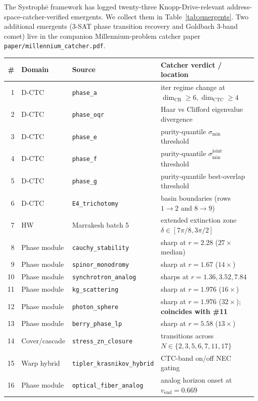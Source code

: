 \documentclass[11pt,a4paper]{article}
\begin{document}
The Systroph\=e framework has logged twenty-three Knopp-Drive-relevant address-space-catcher-verified emergents. We collect them in Table~\ref{tab:emergents}. Two additional emergents (3-SAT phase transition recovery and Goldbach 3-band comet) live in the companion Millennium-problem catcher paper \texttt{paper/millennium\_catcher.pdf}.
\begin{table}[h]
\centering
\small
\begin{tabular}{rlll}
\toprule
\# & Domain & Source & Catcher verdict / location \\
\midrule
1 & D-CTC & \texttt{phase\_a} & iter regime change at $\dim_{\mathrm{CR}}{\ge}6,\dim_{\mathrm{CTC}}{\ge}4$ \\
2 & D-CTC & \texttt{phase\_oqr} & Haar vs Clifford eigenvalue divergence \\
3 & D-CTC & \texttt{phase\_e} & purity-quantile $\sigma_{\min}$ threshold \\
4 & D-CTC & \texttt{phase\_f} & purity-quantile $\sigma_{\min}^{\mathrm{joint}}$ threshold \\
5 & D-CTC & \texttt{phase\_g} & purity-quantile best-overlap threshold \\
6 & D-CTC & \texttt{E4\_trichotomy} & basin boundaries (rows $1{\to}2$ and $8{\to}9$)\\
7 & HW & Marrakesh batch 5 & extended extinction zone $\delta\in[7\pi/8,3\pi/2]$\\
8 & Phase module & \texttt{cauchy\_stability} & sharp at $r=2.28$ ($27\times$ median)\\
9 & Phase module & \texttt{spinor\_monodromy} & sharp at $r=1.67$ ($14\times$)\\
10 & Phase module & \texttt{synchrotron\_analog} & sharps at $r=1.36, 3.52, 7.84$\\
11 & Phase module & \texttt{kg\_scattering} & sharp at $r=1.976$ ($16\times$)\\
12 & Phase module & \texttt{photon\_sphere} & sharp at $r=1.976$ ($32\times$); \textbf{coincides with \#11}\\
13 & Phase module & \texttt{berry\_phase\_lp} & sharp at $r=5.58$ ($13\times$)\\
14 & Cover/cascade & \texttt{stress\_zn\_closure} & transitions across $N\in\{2,3,5,6,7,11,17\}$\\
15 & Warp hybrid & \texttt{tipler\_krasnikov\_hybrid} & CTC-band on/off NEC gating\\
16 & Phase module & \texttt{optical\_fiber\_analog} & analog horizon onset at $v_{\mathrm{end}}{=}0.669$\\

\end{tabular}
\end{table}
\end{document}
